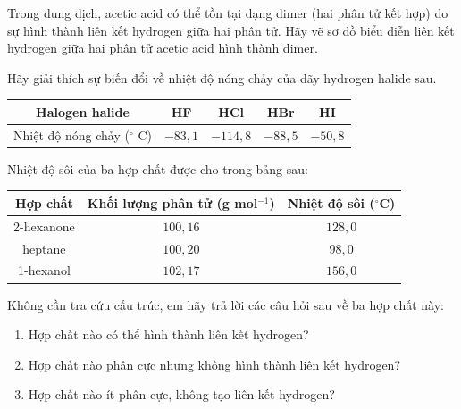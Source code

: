 \begin{bt}
	Trong dung dịch, acetic acid có thể tồn tại dạng dimer (hai phân tử kết hợp) do sự hình thành liên kết hydrogen giữa hai phân tử. Hãy vẽ sơ đồ biểu diễn liên kết hydrogen giữa hai phân tử acetic acid hình thành dimer.
	\loigiai{}
\end{bt}

\begin{bt}
	Hãy giải thích sự biến đổi về nhiệt độ nóng chảy của dãy hydrogen halide sau.
	\begin{center}
		\begin{tabular}{|c|c|c|c|c|}
			\hline
			Halogen halide & HF & HCl & HBr & HI \\
			\hline
			Nhiệt độ nóng chảy ($^\circ$ C) & $-83{,}1$ & $-114{,}8$ & $-88{,}5$ & $-50{,}8$ \\
			\hline
		\end{tabular}
	\end{center}
\end{bt}

\begin{bt}
	Nhiệt độ sôi của ba hợp chất được cho trong bảng sau:
	\begin{center}
		\begin{tabular}{|c|c|c|}
			\hline
			Hợp chất & Khối lượng phân tử (g mol$^{-1}$) & Nhiệt độ sôi ($^\circ$C) \\
			\hline
			2-hexanone & $100{,}16$ & $128{,}0$ \\
			\hline
			heptane & $100{,}20$ & $98{,}0$ \\
			\hline
			1-hexanol & $102{,}17$ & $156{,}0$ \\
			\hline
		\end{tabular}
	\end{center}
	Không cần tra cứu cấu trúc, em hãy trả lời các câu hỏi sau về ba hợp chất này:
	\begin{enumerate}
		\item Hợp chất nào có thể hình thành liên kết hydrogen?
		\item Hợp chất nào phân cực nhưng không hình thành liên kết hydrogen?
		\item Hợp chất nào ít phân cực, không tạo liên kết hydrogen?
	\end{enumerate}
\end{bt}


